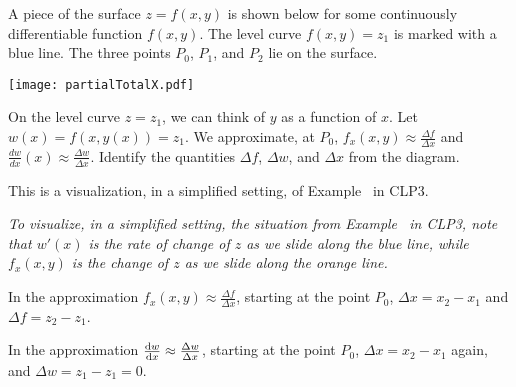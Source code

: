 \begin{solution}
\end{solution}
\begin{question}A piece of the surface $z=f(x,y)$ is shown below for some continuously differentiable function $f(x,y)$. The level curve $f(x,y)=z_1$ is marked with a blue line. The three points $P_0$, $P_1$, and $P_2$ lie on the surface.
	
\texttt{[image: partialTotalX.pdf]}
	
	On the level curve $z=z_1$, we can think of $y$ as a function of $x$. Let $w(x)=f(x,y(x))=z_1$. We approximate, at $P_0$, $f_x(x,y) \approx \frac{\Delta f}{\Delta x}$ and $\frac{dw}{dx}(x)\approx\frac{\Delta w}{\Delta x}$. Identify the quantities $\Delta f$, $\Delta w$, and $\Delta x$ from the diagram.%
	
\end{question}
\begin{hint}
This is a visualization, in a simplified setting, of Example~ in CLP3.
\end{hint}
\begin{answer}
	
\textit{To visualize, in a simplified setting, the situation from Example~ in CLP3, note that $w'(x)$ is the rate of change of $z$ as we slide along the blue line, while $f_x(x,y)$ is the change of $z$ as we slide along the orange line.}
	
In the approximation $f_x(x,y)\approx \frac{\Delta f}{\Delta x}$, starting at the point $P_0$, $\Delta x=x_2-x_1$ and $\Delta f=z_2-z_1$.

In the approximation $\diff{w}{x}\approx \frac{\Delta w}{\Delta x}$, starting at the point $P_0$,  $\Delta x=x_2-x_1$ again, and $\Delta w=z_1-z_1=0$.

\end{answer}
